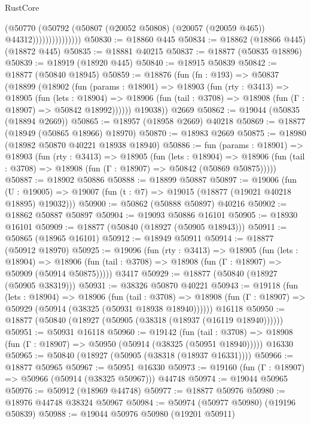 \begin{lexlean}{RustCore}
\begin{coremodule}
                            (@50770
                              (@50792
                                (@50807 (@20052 @50808) (@20057 (@20059 @465)) @44312)))))))))))))))
@50830 := @18860 @445
@50834 := @18862 (@18866 @445) (@18872 @445)
@50835 := @18881 @40215
@50837 := @18877 (@50835 @18896)
@50839 := @18919 (@18920 @445)
@50840 := @18915 @50839
@50842 := @18877 (@50840 @18945)
@50859 := @18876
    (fun (fn : @193) =>
    @50837
      (@18899
        (@18902
          (fun (params : @18901) =>
          @18903
            (fun (rty : @3413) =>
            @18905
              (fun (lets : @18904) =>
              @18906 (fun (tail : @3708) => @18908 (fun (Γ : @18907) => @50842 @18992))))))
        @19038))
    @2669
@50862 := @19044 (@50835 (@18894 @2669))
@50865 := @18957 (@18958 @2669) @40218
@50869 := @18877 (@18949 (@50865 @18966) @18970)
@50870 := @18983 @2669
@50875 := @18980 (@18982 @50870 @40221 @18938 @18940)
@50886 := fun (params : @18901) =>
  @18903
    (fun (rty : @3413) =>
    @18905
      (fun (lets : @18904) =>
      @18906 (fun (tail : @3708) => @18908 (fun (Γ : @18907) => @50842 (@50869 @50875)))))
@50887 := @18902 @50886
@50888 := @18899 @50887
@50897 := @19006
    (fun (U : @19005) => @19007 (fun (t : @7) => @19015 (@18877 (@19021 @40218 @18895) @19032)))
@50900 := @50862 (@50888 @50897) @40216
@50902 := @18862 @50887 @50897
@50904 := @19093 @50886 @16101
@50905 := @18930 @16101
@50909 := @18877 (@50840 (@18927 (@50905 @18943)))
@50911 := @50865 (@18965 @16101)
@50912 := @18949 @50911
@50914 := @18877 (@50912 @18970)
@50925 := @19096
    (fun (rty : @3413) =>
    @18905
      (fun (lets : @18904) =>
      @18906 (fun (tail : @3708) => @18908 (fun (Γ : @18907) => @50909 (@50914 @50875)))))
    @3417
@50929 := @18877 (@50840 (@18927 (@50905 @38319)))
@50931 := @38326 @50870 @40221
@50943 := @19118
    (fun (lets : @18904) =>
    @18906
      (fun (tail : @3708) =>
      @18908 (fun (Γ : @18907) => @50929 (@50914 (@38325 (@50931 @18938 @18940))))))
    @16118
@50950 := @18877 (@50840 (@18927 (@50905 (@38318 (@18937 (@16119 @18940))))))
@50951 := @50931 @16118
@50960 := @19142
    (fun (tail : @3708) => @18908 (fun (Γ : @18907) => @50950 (@50914 (@38325 (@50951 @18940)))))
    @16330
@50965 := @50840 (@18927 (@50905 (@38318 (@18937 @16331))))
@50966 := @18877 @50965
@50967 := @50951 @16330
@50973 := @19160 (fun (Γ : @18907) => @50966 (@50914 (@38325 @50967))) @44748
@50974 := @19044 @50965
@50976 := @50912 (@18969 @44748)
@50977 := @18877 @50976
@50980 := @18976 @44748 @38324 @50967
@50984 := @50974 (@50977 @50980) (@19196 @50839)
@50988 := @19044 @50976 @50980 (@19201 @50911)

\end{coremodule}
\end{lexlean}
